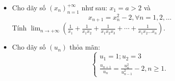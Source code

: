 \documentclass[11pt]{scrartcl}
\begin{document}
\begin{itemize}[label=, leftmargin=0em, itemsep=0.5em]
\begin{btvn}
\[            \right.
        \]
        Tìm giới hạn của dãy số $(u_n)$.
    \end{btvn}
    \item \begin{btvn}
        Cho dãy số $\left(x_n\right)_{n=1}^{+\infty}$ như sau: $x_1=a>2$ và
            $$
            x_{n+1}=x_n^2-2, \forall n=1,2, \ldots
            $$
            Tính $\displaystyle\lim _{n \rightarrow+\infty}\left(\frac{1}{x_1}+\frac{1}{x_1 x_2}+\frac{1}{x_1 x_2 x_3}+\cdots+\frac{1}{x_1 x_2 \ldots x_n}\right)$.
    \end{btvn}
    \item \begin{btvn}
        Cho dãy số $\left(u_n\right)$ thỏa mãn:
        $$
        \left\{\begin{array}{l}
        u_1=1 ; u_2=3 \\
        \frac{u_{n+1}}{u_n}=\frac{u_n^2}{u_{n-1}^2}-2, n \geq 1 .
        \end{array}\right.
        $$


\end{btvn}
\end{itemize}
\end{document}
